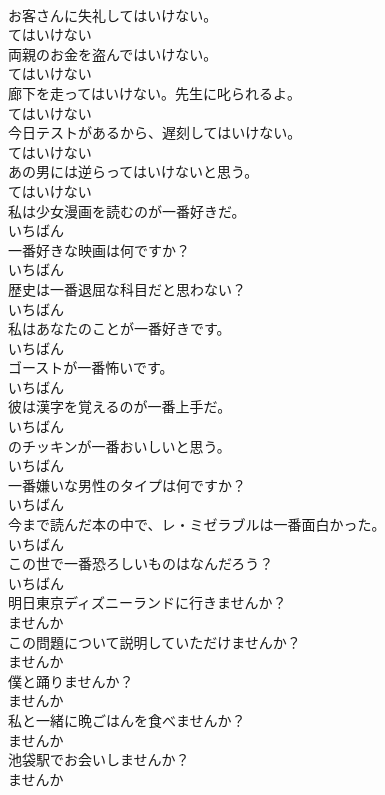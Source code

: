 \documentclass[8pt]{extreport}
\begin{document}
\begin{CJK}{UTF8}{min}
\\	お客さんに失礼してはいけない。	
\\	てはいけない
\\	両親のお金を盗んではいけない。	
\\	てはいけない
\\	廊下を走ってはいけない。先生に叱られるよ。	
\\	てはいけない
\\	今日テストがあるから、遅刻してはいけない。	
\\	てはいけない
\\	あの男には逆らってはいけないと思う。	
\\	てはいけない
\\	私は少女漫画を読むのが一番好きだ。	
\\	いちばん
\\	一番好きな映画は何ですか？	
\\	いちばん
\\	歴史は一番退屈な科目だと思わない？	
\\	いちばん
\\	私はあなたのことが一番好きです。	
\\	いちばん
\\	ゴーストが一番怖いです。	
\\	いちばん
\\	彼は漢字を覚えるのが一番上手だ。	
\\	いちばん
\\	のチッキンが一番おいしいと思う。	
\\	いちばん
\\	一番嫌いな男性のタイプは何ですか？	
\\	いちばん
\\	今まで読んだ本の中で、レ・ミゼラブルは一番面白かった。	
\\	いちばん
\\	この世で一番恐ろしいものはなんだろう？	
\\	いちばん
\\	明日東京ディズニーランドに行きませんか？	
\\	ませんか
\\	この問題について説明していただけませんか？	
\\	ませんか
\\	僕と踊りませんか？	
\\	ませんか
\\	私と一緒に晩ごはんを食べませんか？	
\\	ませんか
\\	池袋駅でお会いしませんか？	
\\	ませんか

\end{CJK}
\end{document}
